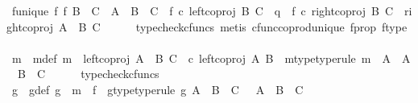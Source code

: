 \begin{isabellebody}
\ f{\isacharunderscore}{\kern0pt}unique{\isacharcolon}{\kern0pt}\ {\isachardoublequoteopen}{\isacharparenleft}{\kern0pt}{\isasymexists}{\isacharbang}{\kern0pt}f{\isachardot}{\kern0pt}\ {\isacharparenleft}{\kern0pt}f{\isacharcolon}{\kern0pt}\ {\isacharparenleft}{\kern0pt}B\ {\isasymCoprod}\ C{\isacharparenright}{\kern0pt}\ {\isasymrightarrow}\ {\isacharparenleft}{\kern0pt}{\isacharparenleft}{\kern0pt}A\ {\isasymCoprod}\ B{\isacharparenright}{\kern0pt}\ {\isasymCoprod}\ C{\isacharparenright}{\kern0pt}{\isacharparenright}{\kern0pt}\ {\isasymand}\ {\isacharparenleft}{\kern0pt}f\ {\isasymcirc}\isactrlsub c\ left{\isacharunderscore}{\kern0pt}coproj\ B\ C\ {\isacharequal}{\kern0pt}\ q{\isacharparenright}{\kern0pt}\ {\isasymand}\ {\isacharparenleft}{\kern0pt}f\ {\isasymcirc}\isactrlsub c\ right{\isacharunderscore}{\kern0pt}coproj\ B\ C\ {\isacharequal}{\kern0pt}\ right{\isacharunderscore}{\kern0pt}coproj\ {\isacharparenleft}{\kern0pt}A\ {\isasymCoprod}\ B{\isacharparenright}{\kern0pt}\ C{\isacharparenright}{\kern0pt}{\isacharparenright}{\kern0pt}{\isachardoublequoteclose}\isanewline
\ \ \ \ \isamarkupfalse%
\ {\isacharparenleft}{\kern0pt}typecheck{\isacharunderscore}{\kern0pt}cfuncs{\isacharcomma}{\kern0pt}\ metis\ cfunc{\isacharunderscore}{\kern0pt}coprod{\isacharunderscore}{\kern0pt}unique\ f{\isacharunderscore}{\kern0pt}prop\ f{\isacharunderscore}{\kern0pt}type{\isacharparenright}{\kern0pt}\isanewline
\isanewline
\ \ \isamarkupfalse%
\ m\ \ m{\isacharunderscore}{\kern0pt}def{\isacharcolon}{\kern0pt}\ {\isachardoublequoteopen}m\ {\isacharequal}{\kern0pt}\ {\isacharparenleft}{\kern0pt}left{\isacharunderscore}{\kern0pt}coproj\ {\isacharparenleft}{\kern0pt}A\ {\isasymCoprod}\ B{\isacharparenright}{\kern0pt}\ C\ {\isacharparenright}{\kern0pt}\ {\isasymcirc}\isactrlsub c\ {\isacharparenleft}{\kern0pt}left{\isacharunderscore}{\kern0pt}coproj\ A\ B{\isacharparenright}{\kern0pt}{\isachardoublequoteclose}\ \ m{\isacharunderscore}{\kern0pt}type{\isacharbrackleft}{\kern0pt}type{\isacharunderscore}{\kern0pt}rule{\isacharbrackright}{\kern0pt}{\isacharcolon}{\kern0pt}\ {\isachardoublequoteopen}m\ {\isacharcolon}{\kern0pt}\ A\ {\isasymrightarrow}\ {\isacharparenleft}{\kern0pt}A\ {\isasymCoprod}\ B{\isacharparenright}{\kern0pt}\ {\isasymCoprod}\ C{\isachardoublequoteclose}\isanewline
\ \ \ \ \isamarkupfalse%
\ typecheck{\isacharunderscore}{\kern0pt}cfuncs\isanewline
\ \ \isamarkupfalse%
\ g\ \ g{\isacharunderscore}{\kern0pt}def{\isacharcolon}{\kern0pt}\ {\isachardoublequoteopen}g\ {\isacharequal}{\kern0pt}\ m\ {\isasymamalg}\ f{\isachardoublequoteclose}\ \ g{\isacharunderscore}{\kern0pt}type{\isacharbrackleft}{\kern0pt}type{\isacharunderscore}{\kern0pt}rule{\isacharbrackright}{\kern0pt}{\isacharcolon}{\kern0pt}\ {\isachardoublequoteopen}g{\isacharcolon}{\kern0pt}\ A\ {\isasymCoprod}\ {\isacharparenleft}{\kern0pt}B\ {\isasymCoprod}\ C{\isacharparenright}{\kern0pt}\ \ {\isasymrightarrow}\ {\isacharparenleft}{\kern0pt}A\ {\isasymCoprod}\ B{\isacharparenright}{\kern0pt}\ {\isasymCoprod}\ C{\isachardoublequoteclose}\isanewline

\end{isabellebody}
